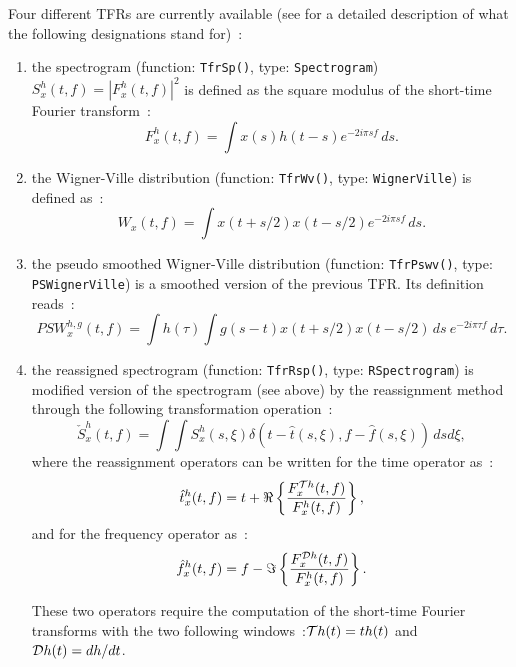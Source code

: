 \documentclass{article}
\begin{document}
Four different TFRs are currently available (see
\cite{flandrin99:tf_ts} for a detailed description of what the
following designations stand for)~:
\begin{enumerate}
\item the spectrogram (function:
  \texttt{TfrSp()}, type: \texttt{Spectrogram})
  $S_x^h(t,f)=|F_x^h(t,f)|^2$ is defined as the
  square modulus of the short-time Fourier transform~:
\begin{equation}
\label{sp}
F_x^h(t,f)=\int{x(s)h(t-s)e^{-2i\pi sf}\,ds}.
\end{equation}
\item the Wigner-Ville distribution (function: \texttt{TfrWv()}, type:
\texttt{WignerVille}) is defined as~:
\begin{equation}
\label{wv}
W_x(t,f)=\int{x(t+s/2)x(t-s/2)e^{-2i\pi sf}\,ds}.
\end{equation}
\item the pseudo smoothed Wigner-Ville distribution (function:
\texttt{TfrPswv()}, type: \texttt{PSWignerVille}) is a smoothed
version of the previous TFR. Its definition reads~:
\begin{equation}
\label{pswv}
PSW_x^{h,g}(t,f)=\int{h(\tau)\int{g(s-t)x(t+s/2)x(t-s/2)\,ds}\:e^{-2i\pi \tau
f}\,d\tau}.
\end{equation}
\item the reassigned spectrogram (function: \texttt{TfrRsp()}, type:
\texttt{RSpectrogram}) is modified version of the spectrogram (see
above) by the reassignment method through the following transformation
operation~:
\begin{equation}
\label{rsp}
\check{S}_x^h(t,f)=\int{\!\!\!\int{S_x^{h}(s,\xi)\delta(t-\hat{t}(s,\xi),f-\hat{f}(s,\xi))\,dsd\xi}},
\end{equation}
where the reassignment operators can be written for the time operator as~:
\begin{equation}
\hat{t}_x^{h}(t,f)=t+\Re\left\{\frac{F_x^{{\cal T}h}(t,f)}{F_x^h(t,f)}\right\},
\end{equation}
and for the frequency operator as~:
\begin{equation}
\hat{f}_x^{h}(t,f)=f-\Im\left\{\frac{F_x^{{\cal D}h}(t,f)}{F_x^h(t,f)}\right\}.
\end{equation}

These two operators require the computation of the short-time Fourier
transforms with the two following windows~:${\cal T}h(t)=t
h(t)$ and ${\cal D}h(t)=dh/dt$.
\end{enumerate}
\end{document}
